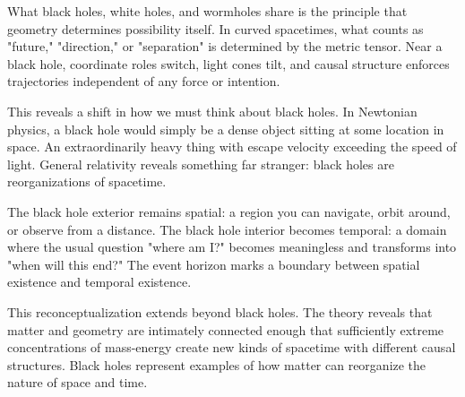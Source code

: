 What black holes, white holes, and wormholes share is the principle that geometry determines possibility itself. In curved spacetimes, what counts as "future," "direction," or "separation" is determined by the metric tensor. Near a black hole, coordinate roles switch, light cones tilt, and causal structure enforces trajectories independent of any force or intention.

This reveals a shift in how we must think about black holes. In Newtonian physics, a black hole would simply be a dense object sitting at some location in space. An extraordinarily heavy thing with escape velocity exceeding the speed of light. General relativity reveals something far stranger: black holes are reorganizations of spacetime.

The black hole exterior remains spatial: a region you can navigate, orbit around, or observe from a distance. The black hole interior becomes temporal: a domain where the usual question "where am I?" becomes meaningless and transforms into "when will this end?" The event horizon marks a boundary between spatial existence and temporal existence.

This reconceptualization extends beyond black holes. The theory reveals that matter and geometry are intimately connected enough that sufficiently extreme concentrations of mass-energy create new kinds of spacetime with different causal structures. Black holes represent examples of how matter can reorganize the nature of space and time.

\newpage

